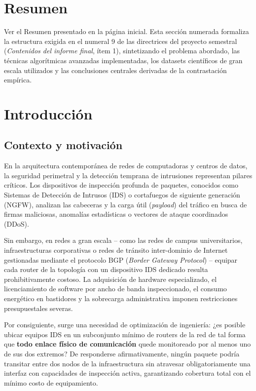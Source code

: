 \documentclass[11pt,a4paper]{article}
\begin{document}
\tableofcontents
\thispagestyle{fancy}
\newpage

\section{Resumen}

Ver el Resumen presentado en la página inicial. Esta sección numerada formaliza la estructura exigida en el numeral 9 de las directrices del proyecto semestral (\emph{Contenidos del informe final}, ítem 1), sintetizando el problema abordado, las técnicas algorítmicas avanzadas implementadas, los datasets científicos de gran escala utilizados y las conclusiones centrales derivadas de la contrastación empírica.

\section{Introducción}

\subsection{Contexto y motivación}
En la arquitectura contemporánea de redes de computadoras y centros de datos, la seguridad perimetral y la detección temprana de intrusiones representan pilares críticos. Los dispositivos de inspección profunda de paquetes, conocidos como Sistemas de Detección de Intrusos (IDS) o cortafuegos de siguiente generación (NGFW), analizan las cabeceras y la carga útil (\textit{payload}) del tráfico en busca de firmas maliciosas, anomalías estadísticas o vectores de ataque coordinados (DDoS). 

Sin embargo, en redes a gran escala -- como las redes de campus universitarios, infraestructuras corporativas o redes de tránsito inter-dominio de Internet gestionadas mediante el protocolo BGP (\textit{Border Gateway Protocol}) -- equipar cada router de la topología con un dispositivo IDS dedicado resulta prohibitivamente costoso. La adquisición de hardware especializado, el licenciamiento de software por ancho de banda inspeccionado, el consumo energético en bastidores y la sobrecarga administrativa imponen restricciones presupuestales severas.

Por consiguiente, surge una necesidad de optimización de ingeniería: ¿es posible ubicar equipos IDS en un subconjunto mínimo de routers de la red de tal forma que \textbf{todo enlace físico de comunicación} quede monitoreado por al menos uno de sus dos extremos? De responderse afirmativamente, ningún paquete podría transitar entre dos nodos de la infraestructura sin atravesar obligatoriamente una interfaz con capacidades de inspección activa, garantizando cobertura total con el mínimo costo de equipamiento.
\end{document}
